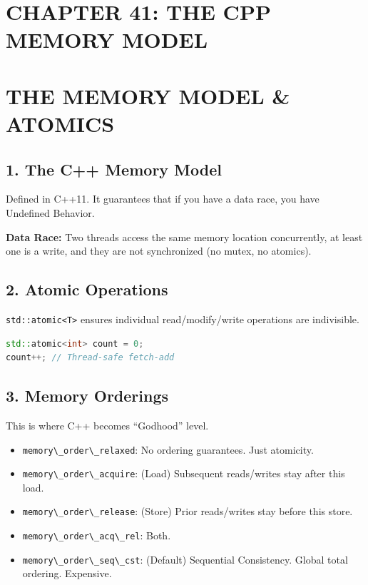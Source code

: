 \hypertarget{chapter-41-the-cpp-memory-model}{%
\section{CHAPTER 41: THE CPP MEMORY
MODEL}\label{chapter-41-the-cpp-memory-model}}

\hypertarget{the-memory-model-atomics}{%
\section{THE MEMORY MODEL \& ATOMICS}\label{the-memory-model-atomics}}

\hypertarget{the-c-memory-model}{%
\subsection{1. The C++ Memory Model}\label{the-c-memory-model}}

Defined in C++11. It guarantees that if you have a data race, you have
Undefined Behavior.

\textbf{Data Race:} Two threads access the same memory location
concurrently, at least one is a write, and they are not synchronized (no
mutex, no atomics).

\hypertarget{atomic-operations}{%
\subsection{2. Atomic Operations}\label{atomic-operations}}

\passthrough{\lstinline!std::atomic<T>!} ensures individual
read/modify/write operations are indivisible.

\begin{lstlisting}[language={C++}]
std::atomic<int> count = 0;
count++; // Thread-safe fetch-add
\end{lstlisting}

\hypertarget{memory-orderings}{%
\subsection{3. Memory Orderings}\label{memory-orderings}}

This is where C++ becomes ``Godhood'' level.

\begin{itemize}
\tightlist
\item
  \passthrough{\lstinline!memory\_order\_relaxed!}: No ordering
  guarantees. Just atomicity.
\item
  \passthrough{\lstinline!memory\_order\_acquire!}: (Load) Subsequent
  reads/writes stay after this load.
\item
  \passthrough{\lstinline!memory\_order\_release!}: (Store) Prior
  reads/writes stay before this store.
\item
  \passthrough{\lstinline!memory\_order\_acq\_rel!}: Both.
\item
  \passthrough{\lstinline!memory\_order\_seq\_cst!}: (Default)
  Sequential Consistency. Global total ordering. Expensive.
\end{itemize}

